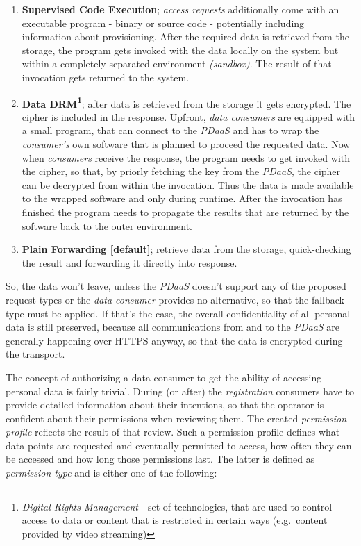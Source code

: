 \documentclass[12pt,english,a4paper,titlepage,cleardoublepage=empty,dottedtoc]{report}
\providecommand{\tightlist}{%
  \setlength{\itemsep}{0pt}\setlength{\parskip}{0pt}}
\begin{document}
\begin{enumerate}
\def\labelenumi{\alph{enumi})}
\tightlist
\item
  \textbf{Supervised Code Execution}; \emph{access requests}
  additionally come with an executable program - binary or source code -
  potentially including information about provisioning. After the
  required data is retrieved from the storage, the program gets invoked
  with the data locally on the system but within a completely separated
  environment \emph{(sandbox)}. The result of that invocation gets
  returned to the system.
\item
  \textbf{Data DRM\footnote{\emph{Digital Rights Management} - set of
    technologies, that are used to control access to data or content
    that is restricted in certain ways (e.g.~content provided by video
    streaming)}}; after data is retrieved from the storage it gets
  encrypted. The cipher is included in the response. Upfront, \emph{data
  consumers} are equipped with a small program, that can connect to the
  \emph{PDaaS} and has to wrap the \emph{consumer's} own software that
  is planned to proceed the requested data. Now when \emph{consumers}
  receive the response, the program needs to get invoked with the
  cipher, so that, by priorly fetching the key from the \emph{PDaaS},
  the cipher can be decrypted from within the invocation. Thus the data
  is made available to the wrapped software and only during runtime.
  After the invocation has finished the program needs to propagate the
  results that are returned by the software back to the outer
  environment.
\item
  \textbf{Plain Forwarding {[}default{]}}; retrieve data from the
  storage, quick-checking the result and forwarding it directly into
  response.
\end{enumerate}

So, the data won't leave, unless the \emph{PDaaS} doesn't support any of
the proposed request types or the \emph{data consumer} provides no
alternative, so that the fallback type must be applied. If that's the
case, the overall confidentiality of all personal data is still
preserved, because all communications from and to the \emph{PDaaS} are
generally happening over HTTPS anyway, so that the data is encrypted
during the transport.

The concept of authorizing a data consumer to get the ability of
accessing personal data is fairly trivial. During (or after) the
\emph{registration} consumers have to provide detailed information about
their intentions, so that the operator is confident about their
permissions when reviewing them. The created \emph{permission profile}
reflects the result of that review. Such a permission profile defines
what data points are requested and eventually permitted to access, how
often they can be accessed and how long those permissions last. The
latter is defined as \emph{permission type} and is either one of the
following:
\end{document}
